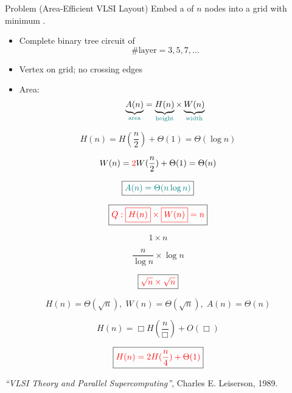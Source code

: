 \begin{frame}{}
  \begin{exampleblock}{Problem (Area-Efficient VLSI Layout)}
    Embed a  of $n$ nodes into a grid with minimum . \\[2pt]
    \begin{itemize}
      \item Complete binary tree circuit of 
	\[
	  \#\text{layer} = 3,5,7,\ldots
	\]
      \item Vertex on grid; no crossing edges
      \item Area:
	\[
	  \underbrace{A(n)}_\text{\textcolor{teal}{area}} = \underbrace{H(n)}_{\text{\textcolor{teal}{height}}} \times \underbrace{W(n)}_{\text{\textcolor{teal}{width}}}
	\]
    \end{itemize}
  \end{exampleblock}

  \pause
\end{frame}

\begin{frame}{}

  \pause
  \[ 
    H(n) = H(\frac{n}{2}) + \Theta(1) = \Theta(\log n) 
  \]

  \pause
  \[ 
    W(n) = \textcolor{red}{2}W(\frac{n}{2}) + \Theta(1) = \Theta(n) 
  \]

  \pause
  \[ 
    \boxed{\textcolor{teal}{A(n) = \Theta(n \log n)}}
  \]
\end{frame}

\begin{frame}{}
  \[ 
    \boxed{\textcolor{red}{Q: \boxed{H(n)} \times \boxed{W(n)} = n}}
  \]
  
  \pause
  \[
    1 \times n
  \]

  \pause
  \[
    \frac{n}{\log n} \times \log n
  \]

  \pause
  \[
    \boxed{\textcolor{red}{\sqrt{n} \times \sqrt{n}}}
  \]

  \pause
  \[
    H(n) = \Theta(\sqrt{n}),\; W(n) = \Theta(\sqrt{n}),\; A(n) = \Theta(n)
  \]

  \pause
  \[
    H(n) = \Box H(\frac{n}{\Box}) + O(\Box) 
  \]

  \pause
  \[ 
    \boxed{\textcolor{red}{H(n) = 2H(\frac{n}{4}) + \Theta(1)}}
  \]
\end{frame}

\begin{frame}{}

  \pause
  \centerline{}
\end{frame}

\begin{frame}{}

  \begin{center}
    {\it ``VLSI Theory and Parallel Supercomputing''}, Charles E. Leiserson, 1989.
  \end{center}
\end{frame}
